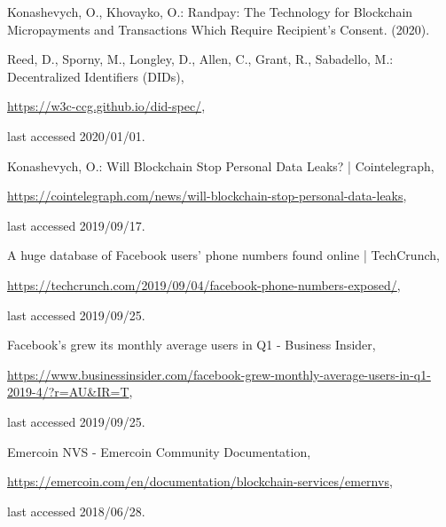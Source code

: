 \begin{multicols}{2}
\begin{thebibliography}{99}
 Konashevych, O., Khovayko, O.: Randpay: The Technology for Blockchain Micropayments and Transactions Which Require Recipient’s Consent. (2020).

 Reed, D., Sporny, M., Longley, D., Allen, C., Grant, R., Sabadello, M.: Decentralized Identifiers (DIDs), 

\url{https://w3c-ccg.github.io/did-spec/},

 last accessed 2020/01/01.

 Konashevych, O.: Will Blockchain Stop Personal Data Leaks? | Cointelegraph, 

\url{https://cointelegraph.com/news/will-blockchain-stop-personal-data-leaks},

last accessed 2019/09/17.

 A huge database of Facebook users’ phone numbers found online | TechCrunch, 

\url{https://techcrunch.com/2019/09/04/facebook-phone-numbers-exposed/}, 

last accessed 2019/09/25.

 Facebook’s grew its monthly average users in Q1 - Business Insider,
 
 \url{https://www.businessinsider.com/facebook-grew-monthly-average-users-in-q1-2019-4/?r=AU\&IR=T},
  
  last accessed 2019/09/25.
  
 Emercoin NVS - Emercoin Community Documentation, 

\url{https://emercoin.com/en/documentation/blockchain-services/emernvs},

last accessed 2018/06/28.

\end{thebibliography}
\end{multicols}
